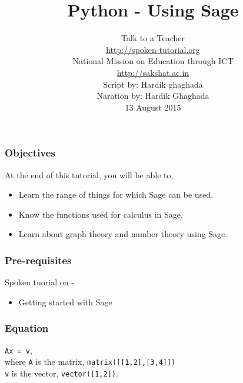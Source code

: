 \documentclass[17pt,compress]{beamer}
\author[FOSSEE]{}
\institute[IIT Bombay]{}
\date[]{}
\begin{document}
\sffamily \bfseries
\title
[Using Sage]
{Python - Using Sage}
\author
[FOSSEE, IIT - Bombay]
{\small Talk to a Teacher\\{\color{blue}\url{http://spoken-tutorial.org}}\\National Mission on Education
 through ICT\\{\color{blue}\url{http://sakshat.ac.in}} \\[0.5cm]{\tiny Script by: Hardik ghaghada \\ Naration by: Hardik Ghaghada \\ 13 August 2015}}

\begin{frame}
   \titlepage
\end{frame}
\begin{frame}
\frametitle{Objectives}
\label{sec-2}

 At the end of this tutorial, you will be able to,\pause

\begin{itemize}
\item Learn the range of things for which Sage can be used.\pause
\item Know the functions used for calculus in Sage.\pause
\item Learn about graph theory and number theory using Sage.
\end{itemize}
\end{frame}
\begin{frame}
\frametitle{Pre-requisites}
\label{sec-3}

  Spoken tuorial on -

\begin{itemize}
\item Getting started with Sage
\end{itemize}
\end{frame}
\begin{frame}
\frametitle{Equation}
\label{sec-4}

  \texttt{Ax = v},\\
  where \texttt{A} is the matrix, \texttt{matrix([[1,2],[3,4]])}\\
  \texttt{v} is the vector, \texttt{vector([1,2])}. 
\end{frame}
\end{document}
